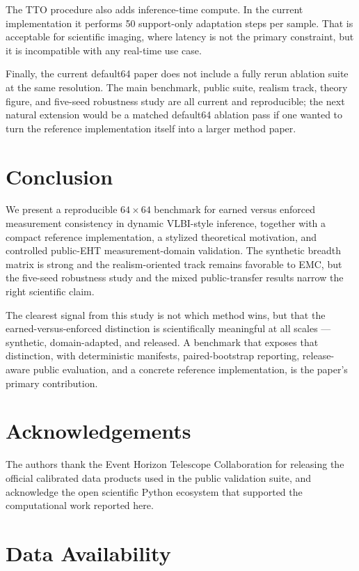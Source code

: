 \documentclass[fleqn,usenatbib]{mnras}
\begin{document}
The TTO procedure also adds inference-time compute. In the current implementation it performs 50 support-only adaptation steps per sample. That is acceptable for scientific imaging, where latency is not the primary constraint, but it is incompatible with any real-time use case.

Finally, the current default64 paper does not include a fully rerun ablation suite at the same resolution. The main benchmark, public suite, realism track, theory figure, and five-seed robustness study are all current and reproducible; the next natural extension would be a matched default64 ablation pass if one wanted to turn the reference implementation itself into a larger method paper.

\section{Conclusion}

We present a reproducible $64\times64$ benchmark for earned versus enforced measurement consistency in dynamic VLBI-style inference, together with a compact reference implementation, a stylized theoretical motivation, and controlled public-EHT measurement-domain validation. The synthetic breadth matrix is strong and the realism-oriented track remains favorable to EMC, but the five-seed robustness study and the mixed public-transfer results narrow the right scientific claim.

The clearest signal from this study is not which method wins, but that the earned-versus-enforced distinction is scientifically meaningful at all scales --- synthetic, domain-adapted, and released. A benchmark that exposes that distinction, with deterministic manifests, paired-bootstrap reporting, release-aware public evaluation, and a concrete reference implementation, is the paper's primary contribution.

\section*{Acknowledgements}

The authors thank the Event Horizon Telescope Collaboration for releasing the official calibrated data products used in the public validation suite, and acknowledge the open scientific Python ecosystem that supported the computational work reported here.

\section*{Data Availability}
\end{document}

